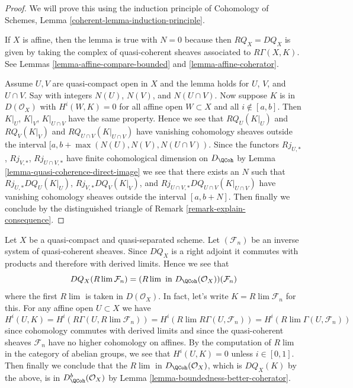 \begin{proof}
We will prove this using the induction principle of
Cohomology of Schemes, Lemma \ref{coherent-lemma-induction-principle}.

\medskip\noindent
If $X$ is affine, then the lemma is true with $N = 0$ because then
$RQ_X = DQ_X$ is given by taking the complex of
quasi-coherent sheaves associated to $R\Gamma(X, K)$.
See Lemmas \ref{lemma-affine-compare-bounded} and \ref{lemma-affine-coherator}.

\medskip\noindent
Assume $U, V$ are quasi-compact open in $X$
and the lemma holds for $U$, $V$, and $U \cap V$.
Say with integers $N(U)$, $N(V)$, and $N(U \cap V)$.
Now suppose $K$ is in $D(\mathcal{O}_X)$ with
$H^i(W, K) = 0$ for all affine open $W \subset X$ and all $i \not \in [a, b]$.
Then $K|_U$, $K|_V$, $K|_{U \cap V}$ have the same property.
Hence we see that $RQ_U(K|_U)$ and $RQ_V(K|_V)$ and
$RQ_{U \cap V}(K|_{U \cap V})$ have vanishing cohomology
sheaves outside the interval $[a, b + \max(N(U), N(V), N(U \cap V))$.
Since the functors $Rj_{U, *}$, $Rj_{V, *}$, $Rj_{U \cap V, *}$
have finite cohomological dimension on $D_\QCoh$ by
Lemma \ref{lemma-quasi-coherence-direct-image}
we see that there exists an $N$ such that
$Rj_{U, *}DQ_U(K|_U)$, $Rj_{V, *}DQ_V(K|_V)$, and
$Rj_{U \cap V, *}DQ_{U \cap V}(K|_{U \cap V})$ have vanishing
cohomology sheaves outside the interval $[a, b + N]$.
Then finally we conclude by the distinguished triangle
of Remark \ref{remark-explain-consequence}.
\end{proof}

\begin{example}
\label{example-inverse-limit-quasi-coherent}
Let $X$ be a quasi-compact and quasi-separated scheme. Let $(\mathcal{F}_n)$
be an inverse system of quasi-coherent sheaves. Since $DQ_X$ is a right
adjoint it commutes with products and therefore with derived limits.
Hence we see that
$$
DQ_X(R\lim \mathcal{F}_n) =
(R\lim\text{ in }D_\QCoh(\mathcal{O}_X))(\mathcal{F}_n)
$$
where the first $R\lim$ is taken in $D(\mathcal{O}_X)$.
In fact, let's write $K = R\lim \mathcal{F}_n$ for this.
For any affine open $U \subset X$ we have
$$
H^i(U, K) =
H^i(R\Gamma(U, R\lim \mathcal{F}_n)) =
H^i(R\lim R\Gamma(U, \mathcal{F}_n)) =
H^i(R\lim \Gamma(U, \mathcal{F}_n))
$$
since cohomology commutes with derived limits and since
the quasi-coherent sheaves
$\mathcal{F}_n$ have no higher cohomology on affines.
By the computation of $R\lim$ in the category of
abelian groups, we see that $H^i(U, K) = 0$
unless $i \in [0, 1]$. Then finally we conclude that
the $R\lim$ in $D_\QCoh(\mathcal{O}_X)$, which is
$DQ_X(K)$ by the above, is in $D^b_\QCoh(\mathcal{O}_X)$
by Lemma \ref{lemma-boundedness-better-coherator}.
\end{example}













